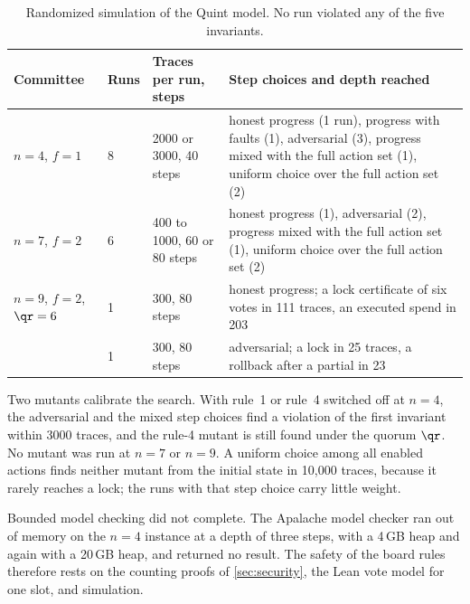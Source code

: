\begin{table}[t]
\centering
\small
\begin{tabularx}{\linewidth}{@{}lll>{\raggedright\arraybackslash}X@{}}
\toprule
Committee & Runs & Traces per run, steps & Step choices and depth reached \\
\midrule
$n = 4$, $f = 1$ & 8 & 2000 or 3000, 40 steps & honest progress (1 run), progress with faults (1), adversarial (3), progress mixed with the full action set (1), uniform choice over the full action set (2) \\
$n = 7$, $f = 2$ & 6 & 400 to 1000, 60 or 80 steps & honest progress (1), adversarial (2), progress mixed with the full action set (1), uniform choice over the full action set (2) \\
$n = 9$, $f = 2$, $\qr = 6$ & 1 & 300, 80 steps & honest progress; a lock certificate of six votes in 111 traces, an executed spend in 203 \\
 & 1 & 300, 80 steps & adversarial; a lock in 25 traces, a rollback after a partial in 23 \\
\bottomrule
\end{tabularx}
\caption{Randomized simulation of the Quint model. No run violated any of the five invariants.}
\label{tab:quint}
\end{table}

Two mutants calibrate the search. With rule~1 or rule~4 switched off at $n = 4$, the adversarial and the mixed step choices find a violation of the first invariant within 3000 traces, and the rule-4 mutant is still found under the quorum $\qr$. No mutant was run at $n = 7$ or $n = 9$. A uniform choice among all enabled actions finds neither mutant from the initial state in 10{,}000 traces, because it rarely reaches a lock; the runs with that step choice carry little weight.

Bounded model checking did not complete. The Apalache model checker ran out of memory on the $n = 4$ instance at a depth of three steps, with a 4\,GB heap and again with a 20\,GB heap, and returned no result. The safety of the board rules therefore rests on the counting proofs of \cref{sec:security}, the Lean vote model for one slot, and simulation.
